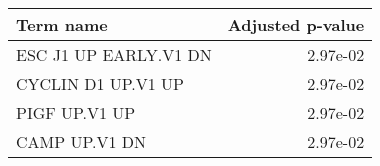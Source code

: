 \begin{tabular}{lr}
\toprule
             Term name &  Adjusted p-value \\
\midrule
 ESC J1 UP EARLY.V1 DN &          2.97e-02 \\
    CYCLIN D1 UP.V1 UP &          2.97e-02 \\
         PIGF UP.V1 UP &          2.97e-02 \\
         CAMP UP.V1 DN &          2.97e-02 \\
\bottomrule
\end{tabular}
